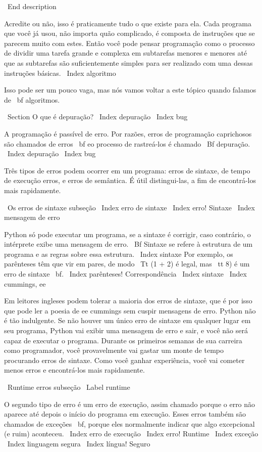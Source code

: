 \documentclass[10pt]{book}
\begin{document}
\begin {itemize}
{\ End {description}

Acredite ou não, isso é praticamente tudo o que existe para ela. Cada
programa que você já usou, não importa quão complicado, é composta de
instruções que se parecem muito com estes. Então você pode pensar
programação como o processo de dividir uma tarefa grande e complexa
em subtarefas menores e menores até que as subtarefas são
suficientemente simples para ser realizado com uma dessas instruções básicas.
\ Index {algoritmo}

Isso pode ser um pouco vaga, mas nós vamos voltar a este tópico
quando falamos de {\ bf algoritmos}.

\ Section {O que é depuração?}
\ Index {depuração}
\ Index {bug}

A programação é passível de erro. Por razões, erros de programação caprichosos
são chamados de erros {\ bf} eo processo de rastreá-los é chamado
{\ Bf depuração}.
\ Index {depuração}
\ Index {bug}

Três tipos de erros podem ocorrer em um programa: erros de sintaxe, de tempo de execução 
erros, e erros de semântica. É útil
distingui-las, a fim de encontrá-los mais rapidamente.

\ {Os erros de sintaxe} subseção
\ Index {erro de sintaxe}
\ Index {erro! Sintaxe}
\ Index {mensagem de erro}

Python só pode executar um programa, se a sintaxe é
corrigir, caso contrário, o intérprete exibe uma mensagem de erro.
{\ Bf} Sintaxe se refere à estrutura de um programa e as regras sobre
essa estrutura. \ Index {} sintaxe
Por exemplo, os parênteses têm que vir em pares, de modo
{\ Tt (1 + 2)} é legal, mas {\ tt 8)} é um erro de sintaxe {\ bf}.
\ Index {parênteses! Correspondência}
\ Index {} sintaxe
\ Index {cummings, ee}

Em leitores ingleses podem tolerar a maioria dos erros de sintaxe, que é por isso que
pode ler a poesia de ee cummings sem cuspir mensagens de erro.
Python não é tão indulgente. Se não houver um único erro de sintaxe
em qualquer lugar em seu programa, Python vai exibir uma mensagem de erro e sair,
e você não será capaz de executar o programa. Durante os primeiros
semanas de sua carreira como programador, você provavelmente vai gastar um monte de
tempo procurando erros de sintaxe. Como você ganhar experiência, você vai
cometer menos erros e encontrá-los mais rapidamente.

\ {Runtime erros} subseção
\ Label {} runtime

O segundo tipo de erro é um erro de execução, assim chamado porque o
erro não aparece até depois o início do programa em execução.
Esses erros também são chamados de exceções {\ bf}, porque eles normalmente
indicar que algo excepcional (e ruim) aconteceu.
\ Index {erro de execução}
\ Index {erro! Runtime}
\ Index {exceção}
\ Index {linguagem segura}
\ Index {língua! Seguro}

}
\end{itemize}
\end{document}
